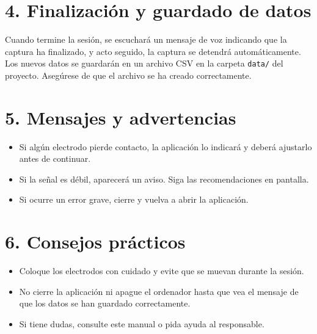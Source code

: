 \section*{4. Finalización y guardado de datos}
Cuando termine la sesión, se escuchará un mensaje de voz indicando que la captura ha finalizado, y acto seguido, la captura se detendrá automáticamente. Los nuevos datos se guardarán en un archivo CSV en la carpeta \texttt{data/} del proyecto. Asegúrese de que el archivo se ha creado correctamente.

\section*{5. Mensajes y advertencias}
\begin{itemize}
    \item Si algún electrodo pierde contacto, la aplicación lo indicará y deberá ajustarlo antes de continuar.
    \item Si la señal es débil, aparecerá un aviso. Siga las recomendaciones en pantalla.
    \item Si ocurre un error grave, cierre y vuelva a abrir la aplicación.
\end{itemize}

\section*{6. Consejos prácticos}
\begin{itemize}
    \item Coloque los electrodos con cuidado y evite que se muevan durante la sesión.
    \item No cierre la aplicación ni apague el ordenador hasta que vea el mensaje de que los datos se han guardado correctamente.
    \item Si tiene dudas, consulte este manual o pida ayuda al responsable.
\end{itemize}
